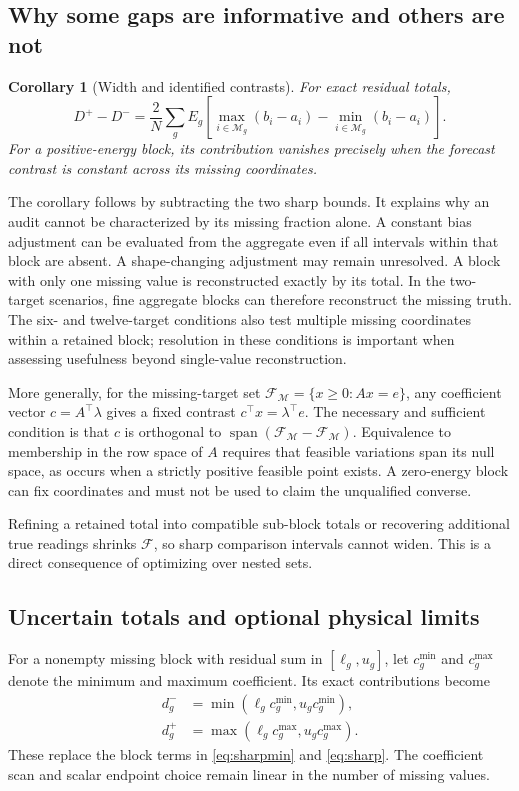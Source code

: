 \documentclass[12pt]{article}
\newtheorem{corollary}{Corollary}
\newcommand{\F}{\mathcal{F}}
\newcommand{\M}{\mathcal{M}}
\begin{document}
\subsection{Why some gaps are informative and others are not}
\begin{corollary}[Width and identified contrasts]
For exact residual totals,
\begin{equation}
 D^+-D^- = \frac{2}{N}\sum_g E_g
 \left[\max_{i\in\M_g}(b_i-a_i)
       -\min_{i\in\M_g}(b_i-a_i)\right].
 \label{eq:width}
\end{equation}
For a positive-energy block, its contribution vanishes precisely when
the forecast contrast is constant across its missing coordinates.
\end{corollary}
The corollary follows by subtracting the two sharp bounds. It explains why
an audit cannot be characterized by its missing fraction alone. A constant
bias adjustment can be evaluated from the aggregate even if all intervals
within that block are absent. A shape-changing adjustment may remain
unresolved. A block with only one missing value is reconstructed exactly
by its total. In the two-target scenarios, fine aggregate blocks can
therefore reconstruct the missing truth. The six- and twelve-target
conditions also test multiple missing coordinates within a retained block;
resolution in these conditions is important when assessing usefulness
beyond single-value reconstruction.

More generally, for the missing-target set
$\F_{\M}=\{x\geq0:Ax=e\}$, any coefficient vector
$c=A^\top\lambda$ gives a fixed contrast $c^\top x=\lambda^\top e$.
The necessary and sufficient condition is that $c$ is orthogonal to
$\operatorname{span}(\F_{\M}-\F_{\M})$. Equivalence to membership in the row space
of $A$ requires that feasible variations span its null space, as occurs
when a strictly positive feasible point exists. A zero-energy block can
fix coordinates and must not be used to claim the unqualified converse.

Refining a retained total into compatible sub-block totals or recovering
additional true readings shrinks $\F$, so sharp comparison intervals cannot
widen. This is a direct consequence of optimizing over nested sets.

\subsection{Uncertain totals and optional physical limits}
For a nonempty missing block with residual sum in $[\ell_g,u_g]$, let
$c_g^{\min}$ and $c_g^{\max}$ denote the minimum and maximum coefficient.
Its exact contributions become
\begin{align}
 d_g^-&=\min(\ell_g c_g^{\min},u_g c_g^{\min}),\\
 d_g^+&=\max(\ell_g c_g^{\max},u_g c_g^{\max}).
 \label{eq:tolerance}
\end{align}
These replace the block terms in \eqref{eq:sharpmin} and \eqref{eq:sharp}. The coefficient scan
and scalar endpoint choice remain linear in the number of missing values.
\end{document}
